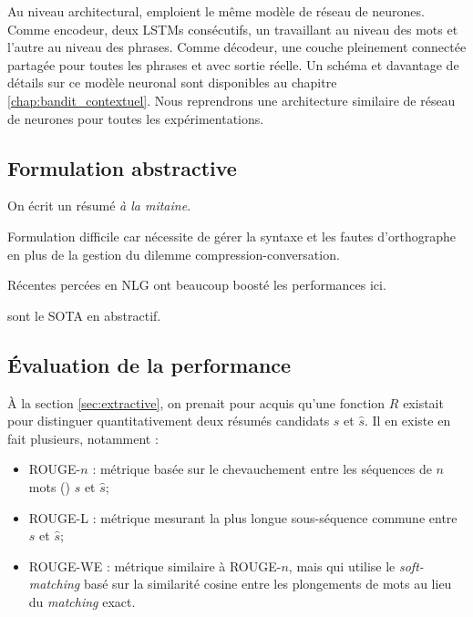 Au niveau architectural, \citep{dong2018banditsum,luo-etal-2019-reading} emploient le
même modèle de réseau de neurones.
Comme encodeur, deux LSTMs consécutifs, un travaillant au niveau
des mots et l'autre au niveau des phrases.
Comme décodeur, une couche pleinement connectée partagée pour toutes les
phrases et avec sortie réelle.
Un schéma et davantage de détails sur ce modèle neuronal sont disponibles
au chapitre \ref{chap:bandit_contextuel}.
Nous reprendrons une architecture similaire de réseau de neurones pour toutes
les expérimentations.

\subsection{Formulation abstractive}

On écrit un résumé \textit{à la mitaine}.

Formulation difficile car nécessite de gérer la syntaxe et les fautes
d'orthographe en plus de la gestion du dilemme compression-conversation.

Récentes percées en NLG ont beaucoup boosté les performances ici.

\citep{2020t5, unilm, zhang2019pegasus} sont le SOTA en abstractif.

\subsection{Évaluation de la performance}
\label{sec:rouge}

À la section \ref{sec:extractive}, on prenait pour acquis qu'une fonction $R$ existait
pour distinguer quantitativement deux résumés candidats $s$ et $\hat{s}$.
Il en existe en fait plusieurs, notamment :

\begin{itemize}
    \item ROUGE-$n$ \citep{lin-2004-rouge}: métrique basée sur le chevauchement entre les séquences de $n$ mots (\ngrams)
          $s$ et $\hat{s}$;
    \item ROUGE-L \citep{lin-2004-rouge}: métrique mesurant la plus longue sous-séquence commune
          entre $s$ et $\hat{s}$;
    \item ROUGE-WE \citep{ng-abrecht-2015-better}: métrique similaire à ROUGE-$n$, mais qui utilise
          le \textit{soft-matching} basé sur la similarité cosine entre les plongements de mots au lieu
          du \textit{matching} exact.
\end{itemize}

